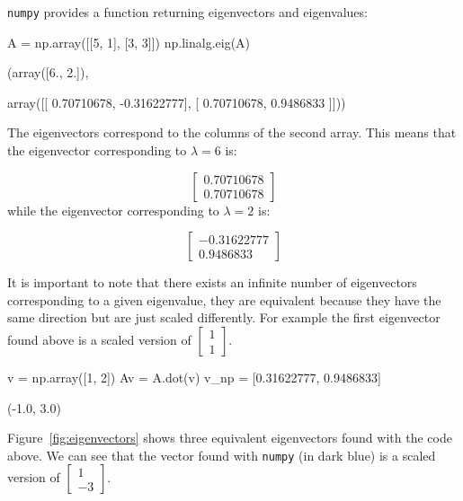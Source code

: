 \texttt{numpy} provides a function returning eigenvectors and eigenvalues: 

\begin{ipythonnon}
A = np.array([[5, 1], [3, 3]])
np.linalg.eig(A)
\end{ipythonnon}
\begin{ioutput}
(array([6., 2.]),

array([[ 0.70710678, -0.31622777],
       [ 0.70710678,  0.9486833 ]]))
\end{ioutput}
The eigenvectors correspond to the columns of the second array. This means that the eigenvector corresponding to $\lambda=6$ is:

\begin{equation*}
\begin{bmatrix}
0.70710678 \\
0.70710678
\end{bmatrix}
\end{equation*}
while the eigenvector corresponding to $\lambda=2$ is:

\begin{equation*}
\begin{bmatrix}
-0.31622777 \\
0.9486833
\end{bmatrix}
\end{equation*}

It is important to note that there exists an infinite number of eigenvectors corresponding to a given eigenvalue, they are equivalent because they have the same direction but are just scaled differently. For example the first eigenvector found above is a scaled version of $\begin{bmatrix}1\\ 1\end{bmatrix}$.

\begin{ipythonnon}
v = np.array([1, 2])
Av = A.dot(v)
v_np = [0.31622777, 0.9486833]	
\end{ipythonnon}
\begin{ioutput}
(-1.0, 3.0)
\end{ioutput}
Figure~\ref{fig:eigenvectors} shows three equivalent eigenvectors found
with the code above. We can see that the vector found with \texttt{numpy} (in dark blue) is a scaled version of $\begin{bmatrix}1\\ -3\end{bmatrix}$.

